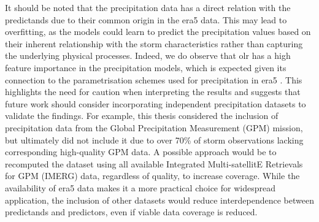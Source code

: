 It should be noted that the precipitation data has a direct relation with the predictands due to their common origin in the \acrshort{era5} data. This may lead to overfitting, as the models could learn to predict the precipitation values based on their inherent relationship with the storm characteristics rather than capturing the underlying physical processes. Indeed, we do observe that \acrshort{olr} has a high feature importance in the precipitation models, which is expected given its connection to the parametrisation schemes used for precipitation in \acrshort{era5} \citep{Hersbach2020}. This highlights the need for caution when interpreting the results and suggests that future work should consider incorporating independent precipitation datasets to validate the findings. For example, this thesis considered the inclusion of precipitation data from the Global Precipitation Measurement (GPM) mission, but ultimately did not include it due to over 70\% of storm observations lacking corresponding high-quality GPM data. A possible approach would be to recomputed the dataset using all available Integrated Multi-satellitE Retrievals for GPM (IMERG) data, regardless of quality, to increase coverage. While the availability of \acrshort{era5} data makes it a more practical choice for widespread application, the inclusion of other datasets would reduce interdependence between predictands and predictors, even if viable data coverage is reduced.